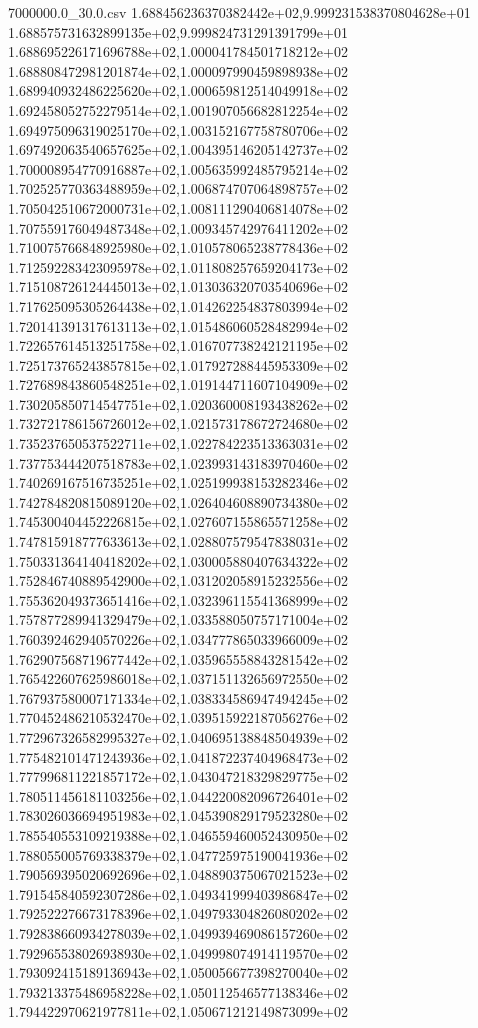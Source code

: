 \begin{filecontents*}{7000000.0_30.0.csv}
1.688456236370382442e+02,9.999231538370804628e+01
1.688575731632899135e+02,9.999824731291391799e+01
1.688695226171696788e+02,1.000041784501718212e+02
1.688808472981201874e+02,1.000097990459898938e+02
1.689940932486225620e+02,1.000659812514049918e+02
1.692458052752279514e+02,1.001907056682812254e+02
1.694975096319025170e+02,1.003152167758780706e+02
1.697492063540657625e+02,1.004395146205142737e+02
1.700008954770916887e+02,1.005635992485795214e+02
1.702525770363488959e+02,1.006874707064898757e+02
1.705042510672000731e+02,1.008111290406814078e+02
1.707559176049487348e+02,1.009345742976411202e+02
1.710075766848925980e+02,1.010578065238778436e+02
1.712592283423095978e+02,1.011808257659204173e+02
1.715108726124445013e+02,1.013036320703540696e+02
1.717625095305264438e+02,1.014262254837803994e+02
1.720141391317613113e+02,1.015486060528482994e+02
1.722657614513251758e+02,1.016707738242121195e+02
1.725173765243857815e+02,1.017927288445953309e+02
1.727689843860548251e+02,1.019144711607104909e+02
1.730205850714547751e+02,1.020360008193438262e+02
1.732721786156726012e+02,1.021573178672724680e+02
1.735237650537522711e+02,1.022784223513363031e+02
1.737753444207518783e+02,1.023993143183970460e+02
1.740269167516735251e+02,1.025199938153282346e+02
1.742784820815089120e+02,1.026404608890734380e+02
1.745300404452226815e+02,1.027607155865571258e+02
1.747815918777633613e+02,1.028807579547838031e+02
1.750331364140418202e+02,1.030005880407634322e+02
1.752846740889542900e+02,1.031202058915232556e+02
1.755362049373651416e+02,1.032396115541368999e+02
1.757877289941329479e+02,1.033588050757171004e+02
1.760392462940570226e+02,1.034777865033966009e+02
1.762907568719677442e+02,1.035965558843281542e+02
1.765422607625986018e+02,1.037151132656972550e+02
1.767937580007171334e+02,1.038334586947494245e+02
1.770452486210532470e+02,1.039515922187056276e+02
1.772967326582995327e+02,1.040695138848504939e+02
1.775482101471243936e+02,1.041872237404968473e+02
1.777996811221857172e+02,1.043047218329829775e+02
1.780511456181103256e+02,1.044220082096726401e+02
1.783026036694951983e+02,1.045390829179523280e+02
1.785540553109219388e+02,1.046559460052430950e+02
1.788055005769338379e+02,1.047725975190041936e+02
1.790569395020692696e+02,1.048890375067021523e+02
1.791545840592307286e+02,1.049341999403986847e+02
1.792522276673178396e+02,1.049793304826080202e+02
1.792838660934278039e+02,1.049939469086157260e+02
1.792965538026938930e+02,1.049998074914119570e+02
1.793092415189136943e+02,1.050056677398270040e+02
1.793213375486958228e+02,1.050112546577138346e+02
1.794422970621977811e+02,1.050671212149873099e+02

\end{filecontents*}

